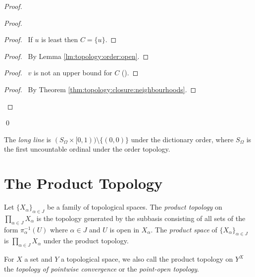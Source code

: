 \begin{proof}
  \pf
  \begin{proof}
    \begin{proof}
      \pf\ If $u$ is least then $C = \{ u \}$.
    \end{proof}
    \step{<2>3}{\pick\ $v < u$ such that $(v, u] \subseteq U$}
    \begin{proof}
      \pf\ By Lemma \ref{lm:topology:order:open}.
    \end{proof}
    \begin{proof}
      \pf\ $v$ is not an upper bound for $C$ ().
    \end{proof}
    \qedstep
    \begin{proof}
      \pf\ By Theorem \ref{thm:topology:closure:neighbourhoods}.
    \end{proof}
  \end{proof}
  \qed
\end{proof}

\begin{df}
  The \emph{long line} is $(S_\Omega \times [0, 1)) \setminus \{(0, 0)\}$
  under the dictionary
  order, where $S_\Omega$ is the first uncountable ordinal under the order
  topology.
\end{df}

\section{The Product Topology}

\begin{df}
  Let $\{ X_\alpha \}_{\alpha \in J}$ be a family of topological spaces. The
  \emph{product topology} on $\prod_{\alpha \in J} X_\alpha$ is the topology
  generated by the subbasis consisting of all sets of the form
  $\pi_\alpha^{-1}(U)$ where $\alpha \in J$ and $U$ is open in $X_\alpha$.
  The \emph{product space} of $\{ X_\alpha \}_{\alpha \in J}$ is
  $\prod_{\alpha \in J} X_\alpha$ under the product topology.

  For $X$ a set and $Y$ a topological space, we also call the product topology on $Y^X$ the \emph{topology of pointwise convergence} or the \emph{point-open topology}.
\end{df}

